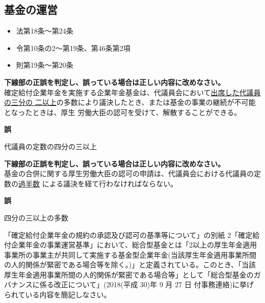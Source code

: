 \newpage

\subsection{基金の運営}

\begin{InyouJobunbox}
  \begin{itemize}
    \item 法第18条〜第24条
    \item 令第10条の2〜第19条、第46条第2項
    \item 則第19条〜第20条
  \end{itemize}
\end{InyouJobunbox}

\begin{truefalse}[年金2 \ 2020 \ 問題1(1)\textcircled{1}]


\textbf{下線部の正誤を判定し、誤っている場合は正しい内容に改めなさい。}
\\
  
確定給付企業年金を実施する企業年金基金は、代議員会において\underline{出席した代議員の三分の
二以上}の多数により議決したとき、または基金の事業の継続が不可能となったときは、厚生
労働大臣の認可を受けて、解散することができる。
\end{truefalse}

\begin{answerbox}
  \textbf{誤}

  代議員の定数の四分の三以上
\end{answerbox}

\begin{truefalse}[年金1 \ 2023 \ 問題1(3)(ア)]
\textbf{下線部の正誤を判定し、誤っている場合は正しい内容に改めなさい。}
\\

  基金の合併に関する厚生労働大臣の認可の申請は、代議員会における代議員の定数の\underline{過半数}
による議決を経て行わなければならない。
\end{truefalse}


\begin{answerbox}
  \textbf{誤}

  四分の三以上の多数
\end{answerbox}

\begin{shortanswer}[年金2 \ 2020 \ 問題2(3)]
  「確定給付企業年金の規約の承認及び認可の基準等について」の別紙 2「確定給付企業年金の事業運営基準」において、総合型基金とは「2以上の厚生年金適用事業所の事業主が共同して実施する基金型企業年金(当該厚生年金適用事業所間の人的関係が緊密である場合等を除く。)」と定義されている。このとき、「当該厚生年金適用事業所間の人的関係が緊密である場合等」として「総合型基金のガバナンスに係る改正について」(2018(平成 30)年 9 月 27 日 付事務連絡)に挙げられている内容を簡記しなさい。
\end{shortanswer}

